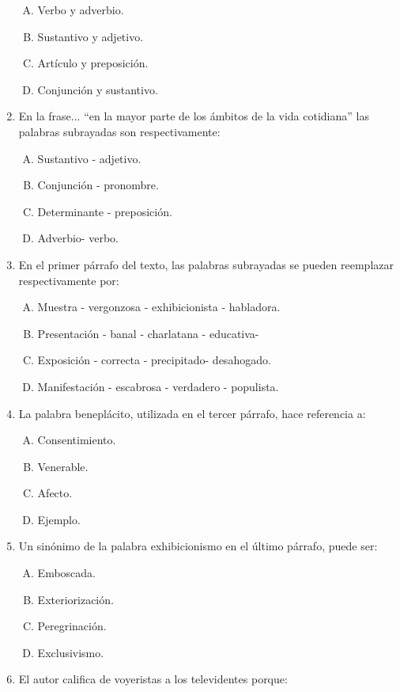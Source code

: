 \begin{enumerate}
\begin{enumerate}[(A)]
\item Verbo y adverbio.
\item Sustantivo y adjetivo.
\item Artículo y preposición.
\item Conjunción y sustantivo.
\end{enumerate}

\newpage
\item  En la frase... ``en la mayor parte de los ámbitos de la vida cotidiana'' las palabras subrayadas son respectivamente:\label{lit-7}

\begin{enumerate}[(A)]
\item Sustantivo - adjetivo.
\item Conjunción - pronombre.
\item Determinante - preposición.
\item Adverbio- verbo.
\end{enumerate}
\item En el primer párrafo del texto, las palabras subrayadas se pueden reemplazar respectivamente por: \label{lit-8}

\begin{enumerate}[(A)]
\item Muestra - vergonzosa - exhibicionista - habladora. 
\item Presentación - banal - charlatana - educativa- 
\item Exposición - correcta - precipitado- desahogado.
\item Manifestación - escabrosa - verdadero - populista.
\end{enumerate}
\item La palabra beneplácito, utilizada en el tercer párrafo, hace referencia a: \label{lit-9}


\begin{enumerate}[(A)]
\item Consentimiento.
\item Venerable.
\item Afecto.
\item Ejemplo. 
\end{enumerate}
\item Un sinónimo de la palabra exhibicionismo en el último párrafo, puede ser: \label{lit-10}

\begin{enumerate}[(A)]
\item Emboscada.
\item Exteriorización.
\item Peregrinación.
\item Exclusivismo. 
\end{enumerate}
\newpage
\item El autor califica de voyeristas a los televidentes porque: \label{lit-11}



\end{enumerate}
